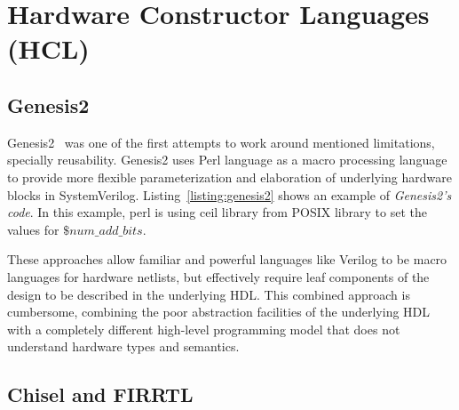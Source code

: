 \section{Hardware Constructor Languages (HCL)}
\subsection{Genesis2}
Genesis2~\cite{genesis2} was one of the first attempts to work around mentioned limitations, specially reusability. Genesis2 uses Perl language as a macro processing language to provide more flexible parameterization and elaboration of underlying hardware blocks in SystemVerilog. Listing~\ref{listing:genesis2} shows an example of \textit{Genesis2's code}.
In this example, perl is using ceil library from POSIX library to set the values for $\$num\_add\_bits$.



These approaches allow familiar and powerful languages like Verilog to be macro languages for hardware netlists, but effectively require leaf components of the design to be described in the underlying HDL.
This combined approach is cumbersome, combining the poor abstraction facilities of the underlying HDL with a completely different high-level programming model that does not understand hardware types and semantics.

\subsection{Chisel and FIRRTL}

